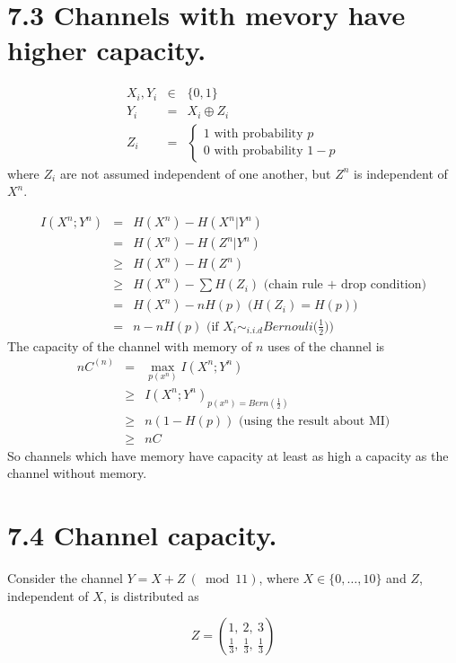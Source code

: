 \documentclass[12pt]{article}
\newcommand{\setbrace}[1]{{\{#1\}}}
\begin{document}
\section*{7.3 Channels with mevory have higher capacity.}
\begin{eqnarray*}
    X_i, Y_i &\in& \{0,1\} \\
    Y_i &=& X_i \oplus Z_i \\
    Z_i &=& \begin{cases}
        1 \text{ with probability } p \\
        0 \text{ with probability } 1 - p
    \end{cases}
\end{eqnarray*}
where $Z_i$ are not assumed independent of one another, but $Z^n$ is independent of $X^n$.

\begin{eqnarray*}
    I(X^n;Y^n) &=& H(X^n) - H(X^n|Y^n) \\
    &=& H(X^n) - H(Z^n|Y^n) \\
    &\ge& H(X^n) - H(Z^n) \\
    &\ge& H(X^n) - \sum H(Z_i) \text{ (chain rule + drop condition)}\\
    &=& H(X^n) - nH(p) \text{ ($H(Z_i) = H(p)$)} \\
    &=& n - nH(p) \text{ (if $X_i \sim_{i.i.d} Bernouli\big(\frac{1}{2}\big)$)}
\end{eqnarray*}
The capacity of the channel with memory of $n$ uses of the channel is
\begin{eqnarray*}
    nC^{(n)} &=& \max_{p(x^n)} I(X^n; Y^n) \\
    &\ge& I(X^n;Y^n)_{p(x^n)=Bern(\frac{1}{2})} \\
    &\ge& n ( 1 - H(p)) \text{ (using the result about MI)} \\
    &\ge& nC
\end{eqnarray*}
So channels which have memory have capacity at least as high a capacity as the channel without memory.

\section*{7.4 Channel capacity.}

Consider the channel $Y=X+Z\ (\bmod 11)$, where $X \in
\setbrace{0,\dots,10}$ and $Z$, independent of $X$, is distributed as

\begin{equation*}
    Z = {{1,\ 2,\ 3}\choose{\frac{1}{3},\ \frac{1}{3},\ \frac{1}{3}}}
\end{equation*}
\end{document}
